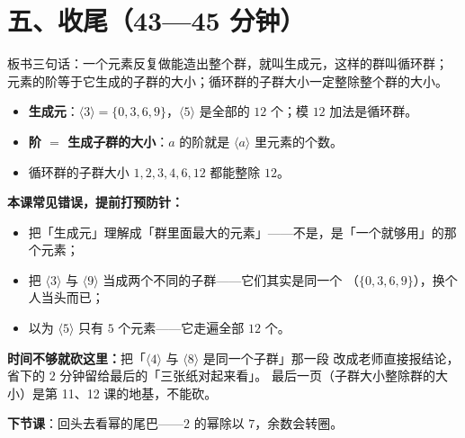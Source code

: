 \section*{五、收尾（43—45 分钟）}

板书三句话：一个元素反复做能造出整个群，就叫生成元，这样的群叫循环群；
元素的阶等于它生成的子群的大小；循环群的子群大小一定整除整个群的大小。

\begin{xiaojie}
  \begin{itemize}
    \item \textbf{生成元}：\(\langle3\rangle=\{0,3,6,9\}\)，\(\langle5\rangle\) 是全部的 \(12\) 个；模 \(12\) 加法是循环群。
    \item \textbf{阶 \(=\) 生成子群的大小}：\(a\) 的阶就是 \(\langle a\rangle\) 里元素的个数。
    \item 循环群的子群大小 \(1,2,3,4,6,12\) 都能整除 \(12\)。
  \end{itemize}
\end{xiaojie}

\begin{zhu}
  \textbf{本课常见错误，提前打预防针：}
  \begin{itemize}
    \item 把「生成元」理解成「群里面最大的元素」——不是，是「一个就够用」的那个元素；
    \item 把 \(\langle 3\rangle\) 与 \(\langle 9\rangle\) 当成两个不同的子群——它们其实是同一个
      （\(\{0,3,6,9\}\)），换个人当头而已；
    \item 以为 \(\langle 5\rangle\) 只有 \(5\) 个元素——它走遍全部 \(12\) 个。
  \end{itemize}
\end{zhu}

\begin{zhu}
  \textbf{时间不够就砍这里：}把「\(\langle 4\rangle\) 与 \(\langle 8\rangle\) 是同一个子群」那一段
  改成老师直接报结论，省下的 \(2\) 分钟留给最后的「三张纸对起来看」。
  最后一页（子群大小整除群的大小）是第 11、12 课的地基，不能砍。
\end{zhu}

\noindent\textbf{下节课}：回头去看幂的尾巴——\(2\) 的幂除以 \(7\)，余数会转圈。